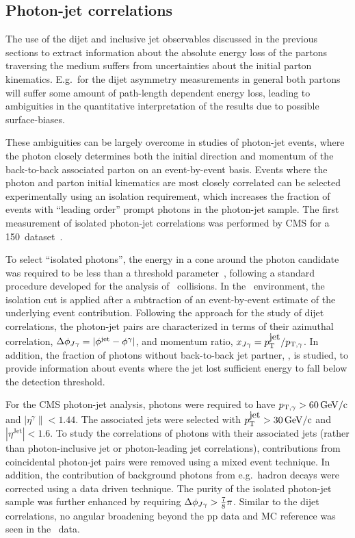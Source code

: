 \subsection{Photon-jet correlations}

The use of the dijet and inclusive jet observables discussed in the previous sections 
to extract information
about the absolute energy loss of the partons traversing the medium suffers from
uncertainties about the initial parton kinematics. E.g.\ for the dijet asymmetry 
measurements in general both partons will suffer some amount of path-length dependent
energy loss, leading to ambiguities in the quantitative interpretation of the results
due to possible surface-biases. 

These ambiguities can be largely overcome in studies of photon-jet events, 
where the photon closely determines both the initial direction and momentum 
of the back-to-back associated parton on an event-by-event basis.
Events where the photon and parton initial kinematics are most closely correlated 
can be selected experimentally using an isolation requirement, which 
increases the fraction of events with ``leading order'' prompt photons in
the photon-jet sample. The first measurement of isolated photon-jet correlations
was performed by CMS for a 150\mubinv \PbPb\ dataset~\cite{Chatrchyan:2012gt}.

To select ``isolated photons'', the energy in a cone around 
the photon candidate was required to be less than a threshold parameter~\cite{HIPhoton},
following a standard procedure developed for the analysis of \pp\ collisions. In the \PbPb\ 
environment, the isolation cut is applied after a subtraction of an event-by-event 
estimate of the underlying event contribution.
Following the approach for the study of dijet correlations, the photon-jet pairs 
are characterized in terms of their azimuthal correlation, $\Delta\phi_{J\gamma} = |\phi^\mathrm{jet} - \phi^{\gamma}|$,
 and momentum ratio, $x_{J\gamma} = p_{\mathrm{T}}^{\mbox{jet}}/p_{\mathrm{T},\gamma}$. In addition, the fraction of photons without 
back-to-back jet partner,  \rjg, is studied, to provide information about 
events where the jet lost sufficient energy to fall below the detection threshold.

For the CMS photon-jet analysis, photons were required to have $p_{\mathrm{T},\gamma} > 60\,\mathrm{GeV/c}$
and  $|\eta^\gamma\|<1.44$. The associated jets were selected with
$p_{\mathrm{T}}^{\mbox{jet}} > 30\,\mathrm{GeV/c}$ and $|\eta^{\mbox{Jet}}|<1.6$. To study the correlations of 
photons with their associated jets (rather than photon-inclusive jet or photon-leading 
jet correlations), contributions from 
coincidental photon-jet pairs were removed using a mixed event technique. In 
addition, the contribution of background photons from e.g.\ hadron decays 
were corrected using a data driven technique. The purity of the isolated photon-jet
sample was further enhanced by requiring $\Delta\phi_{J\gamma} > \frac{7}{8}\pi$.
Similar to the dijet correlations, no angular broadening 
beyond the pp data and MC reference was seen in the \PbPb\ data.

